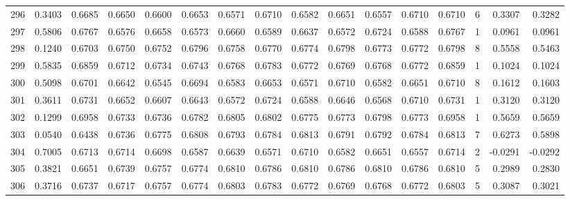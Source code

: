 \begin{tabular}{lrrrrrrrrrrrrrrr}
296 &      0.3403 &  0.6685 &  0.6650 &  0.6600 &  0.6653 &  0.6571 &  0.6710 &  0.6582 &  0.6651 &  0.6557 &   0.6710 &     0.6710 &      6 &                    0.3307 &                     0.3282 \\
297 &      0.5806 &  0.6767 &  0.6576 &  0.6658 &  0.6573 &  0.6660 &  0.6589 &  0.6637 &  0.6572 &  0.6724 &   0.6588 &     0.6767 &      1 &                    0.0961 &                     0.0961 \\
298 &      0.1240 &  0.6703 &  0.6750 &  0.6752 &  0.6796 &  0.6758 &  0.6770 &  0.6774 &  0.6798 &  0.6773 &   0.6772 &     0.6798 &      8 &                    0.5558 &                     0.5463 \\
299 &      0.5835 &  0.6859 &  0.6712 &  0.6734 &  0.6743 &  0.6768 &  0.6783 &  0.6772 &  0.6769 &  0.6768 &   0.6772 &     0.6859 &      1 &                    0.1024 &                     0.1024 \\
300 &      0.5098 &  0.6701 &  0.6642 &  0.6545 &  0.6694 &  0.6583 &  0.6653 &  0.6571 &  0.6710 &  0.6582 &   0.6651 &     0.6710 &      8 &                    0.1612 &                     0.1603 \\
301 &      0.3611 &  0.6731 &  0.6652 &  0.6607 &  0.6643 &  0.6572 &  0.6724 &  0.6588 &  0.6646 &  0.6568 &   0.6710 &     0.6731 &      1 &                    0.3120 &                     0.3120 \\
302 &      0.1299 &  0.6958 &  0.6733 &  0.6736 &  0.6782 &  0.6805 &  0.6802 &  0.6775 &  0.6773 &  0.6798 &   0.6773 &     0.6958 &      1 &                    0.5659 &                     0.5659 \\
303 &      0.0540 &  0.6438 &  0.6736 &  0.6775 &  0.6808 &  0.6793 &  0.6784 &  0.6813 &  0.6791 &  0.6792 &   0.6784 &     0.6813 &      7 &                    0.6273 &                     0.5898 \\
304 &      0.7005 &  0.6713 &  0.6714 &  0.6698 &  0.6587 &  0.6639 &  0.6571 &  0.6710 &  0.6582 &  0.6651 &   0.6557 &     0.6714 &      2 &                   -0.0291 &                    -0.0292 \\
305 &      0.3821 &  0.6651 &  0.6739 &  0.6757 &  0.6774 &  0.6810 &  0.6786 &  0.6810 &  0.6786 &  0.6810 &   0.6786 &     0.6810 &      5 &                    0.2989 &                     0.2830 \\
306 &      0.3716 &  0.6737 &  0.6717 &  0.6757 &  0.6774 &  0.6803 &  0.6783 &  0.6772 &  0.6769 &  0.6768 &   0.6772 &     0.6803 &      5 &                    0.3087 &                     0.3021 \\

\end{tabular}
